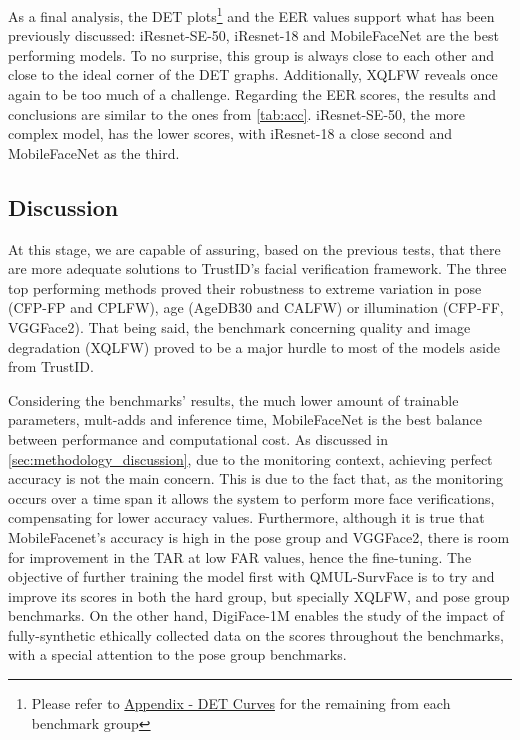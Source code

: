 \documentclass[class=report, crop=false, a4paper, 12pt]{standalone}
\begin{document}
As a final analysis, the DET plots\footnote{Please refer to \hyperref[sec:det_curves_appendix]{Appendix - DET Curves} for the remaining from each benchmark group} and the EER values support what has been previously discussed: iResnet-SE-50, iResnet-18 and MobileFaceNet are the best performing models. To no surprise, this group is always close to each other and close to the ideal corner of the DET graphs. Additionally, XQLFW reveals once again to be too much of a challenge. Regarding the EER scores, the results and conclusions are similar to the ones from \autoref{tab:acc}. iResnet-SE-50, the more complex model, has the lower scores, with iResnet-18 a close second and MobileFaceNet as the third.


\subsection{Discussion}
\par At this stage, we are capable of assuring, based on the previous tests, that there are more adequate solutions to TrustID's facial verification framework. The three top performing methods proved their robustness to extreme variation in pose (CFP-FP and CPLFW), age (AgeDB30 and CALFW) or illumination (CFP-FF, VGGFace2). That being said, the benchmark concerning quality and image degradation (XQLFW) proved to be a major hurdle to most of the models aside from TrustID.

\par Considering the benchmarks' results, the much lower amount of trainable parameters, mult-adds and inference time, MobileFaceNet is the best balance between performance and computational cost. As discussed in \autoref{sec:methodology_discussion}, due to the monitoring context, achieving perfect accuracy is not the main concern. This is due to the fact that, as the monitoring occurs over a time span it allows the system to perform more face verifications, compensating for lower accuracy values.
Furthermore, although it is true that MobileFacenet's accuracy is high in the pose group and VGGFace2, there is room for improvement in the TAR at low FAR values, hence the fine-tuning. The objective of further training the model first with QMUL-SurvFace is to try and improve its scores in both the hard group, but specially XQLFW, and pose group benchmarks. On the other hand, DigiFace-1M enables the study of the impact of fully-synthetic ethically collected data on the scores throughout the benchmarks, with a special attention to the pose group benchmarks. 
\end{document}
